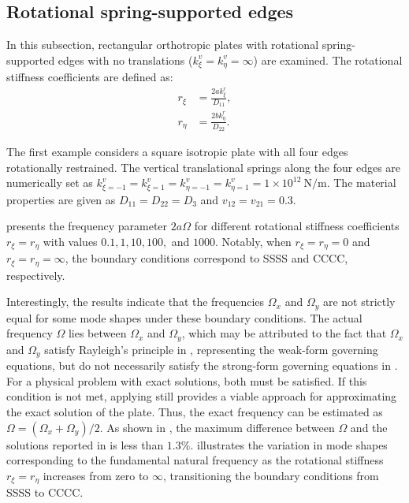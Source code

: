\documentclass[preprint,12pt]{elsarticle}
\newcommand{\ustif}{~\unit{\newton\per\metre}\xspace}
\begin{document}
\subsection{Rotational spring-supported edges}
In this subsection, rectangular orthotropic plates with rotational spring-supported edges with no translations ($k^v_\xi = k^v_\eta = \infty$) are examined.  
The rotational stiffness coefficients are defined as: 
% 
\begin{subequations}\label{eq:rotation_coex}
	\begin{align}
		r_{\xi} &= \frac{2a k^r_{\xi}}{D_{11}}, \\
		r_{\eta} &= \frac{2b k^r_{\eta}}{D_{22}}.
	\end{align}
\end{subequations}

The first example considers a square isotropic plate with all four edges rotationally restrained. 
The vertical translational springs along the four edges are numerically set as $ k^v_{\xi=-1} = k^v_{\xi=1} = k^v_{\eta=-1} = k^v_{\eta=1} = 1 \times 10^{12} \ustif $. 
The material properties are given as $ D_{11} = D_{22} = D_3 $ and $ v_{12} = v_{21} = 0.3 $.  

 presents the frequency parameter $2a\Omega $ for different rotational stiffness coefficients  $ r_{\xi} = r_{\eta} $ with values $ 0.1, 1, 10, 100, $ and $ 1000$.  
Notably, when $ r_{\xi} = r_{\eta} = 0 $ and $r_{\xi} = r_{\eta} = \infty$, the boundary conditions correspond to SSSS and CCCC, respectively.  

Interestingly, the results indicate that the frequencies $\Omega_x$ and $\Omega_y$ are not strictly equal for some mode shapes under these boundary conditions.  
The actual frequency $\Omega$ lies between $\Omega_x$ and $\Omega_y$, which may be attributed to the fact that $\Omega_x$ and $\Omega_y$ satisfy Rayleigh’s principle in , representing the weak-form governing equations, but do not necessarily satisfy the strong-form governing equations in .
For a physical problem with exact solutions, both  must be satisfied.  
If this condition is not met, applying  still provides a viable approach for approximating the exact solution of the plate.  
Thus, the exact frequency can be estimated as $\Omega = (\Omega_x + \Omega_y)/2$.  
As shown in , the maximum difference between \(\Omega\) and the solutions reported in  is less than $1.3\%$.
 illustrates the variation in mode shapes corresponding to the fundamental natural frequency as the rotational stiffness $r_{\xi} = r_{\eta}$ increases from zero to $\infty$, transitioning the boundary conditions from SSSS to CCCC.
\end{document}
